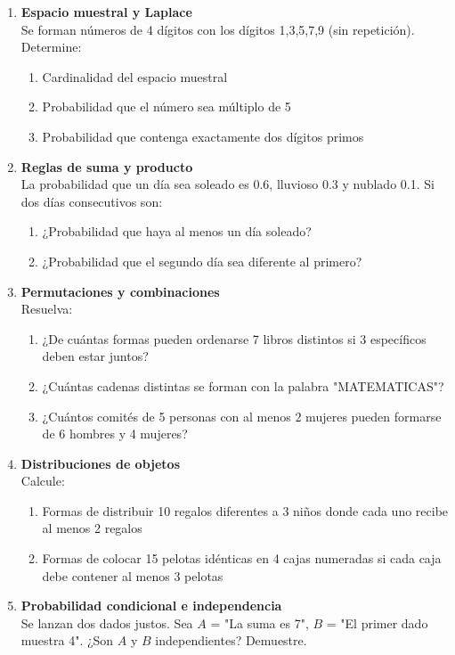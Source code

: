 \documentclass[letterpaper]{article}
\begin{document}
\begin{enumerate}
		\item \textbf{Espacio muestral y Laplace}\\
		Se forman números de 4 dígitos con los dígitos 1,3,5,7,9 (sin repetición). Determine:
		\begin{enumerate}
			\item Cardinalidad del espacio muestral
			\item Probabilidad que el número sea múltiplo de 5
			\item Probabilidad que contenga exactamente dos dígitos primos
		\end{enumerate}
		
		\item \textbf{Reglas de suma y producto}\\
		La probabilidad que un día sea soleado es 0.6, lluvioso 0.3 y nublado 0.1. Si dos días consecutivos son:
		\begin{enumerate}
			\item ¿Probabilidad que haya al menos un día soleado?
			\item ¿Probabilidad que el segundo día sea diferente al primero?
		\end{enumerate}
		
		\item \textbf{Permutaciones y combinaciones}\\
		Resuelva:
		\begin{enumerate}
			\item ¿De cuántas formas pueden ordenarse 7 libros distintos si 3 específicos deben estar juntos?
			\item ¿Cuántas cadenas distintas se forman con la palabra "MATEMATICAS"?
			\item ¿Cuántos comités de 5 personas con al menos 2 mujeres pueden formarse de 6 hombres y 4 mujeres?
		\end{enumerate}
		
		\item \textbf{Distribuciones de objetos}\\
		Calcule:
		\begin{enumerate}
			\item Formas de distribuir 10 regalos diferentes a 3 niños donde cada uno recibe al menos 2 regalos
			\item Formas de colocar 15 pelotas idénticas en 4 cajas numeradas si cada caja debe contener al menos 3 pelotas
		\end{enumerate}
		
		\item \textbf{Probabilidad condicional e independencia}\\
		Se lanzan dos dados justos. Sea $A$ = "La suma es 7", $B$ = "El primer dado muestra 4". ¿Son $A$ y $B$ independientes? Demuestre.
		

\end{enumerate}
\end{document}
